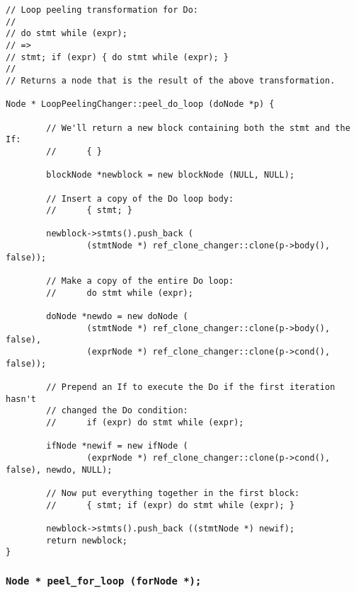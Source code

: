 \documentclass[10pt]{article}
\begin{document}
\begin{small}
\begin{verbatim}
// Loop peeling transformation for Do:
//
// do stmt while (expr);
// =>
// stmt; if (expr) { do stmt while (expr); }
//
// Returns a node that is the result of the above transformation.

Node * LoopPeelingChanger::peel_do_loop (doNode *p) {

        // We'll return a new block containing both the stmt and the If:
        //      { }

        blockNode *newblock = new blockNode (NULL, NULL);

        // Insert a copy of the Do loop body:
        //      { stmt; }

        newblock->stmts().push_back (
                (stmtNode *) ref_clone_changer::clone(p->body(), false));

        // Make a copy of the entire Do loop:
        //      do stmt while (expr);

        doNode *newdo = new doNode (
                (stmtNode *) ref_clone_changer::clone(p->body(), false),
                (exprNode *) ref_clone_changer::clone(p->cond(), false));

        // Prepend an If to execute the Do if the first iteration hasn't 
        // changed the Do condition:
        //      if (expr) do stmt while (expr);

        ifNode *newif = new ifNode (
                (exprNode *) ref_clone_changer::clone(p->cond(), false), newdo, NULL);

        // Now put everything together in the first block:
        //      { stmt; if (expr) do stmt while (expr); }

        newblock->stmts().push_back ((stmtNode *) newif);
        return newblock;
}
\end{verbatim}
\end{small}

\subsubsection{{\tt Node * peel\_for\_loop (forNode *);}}
\end{document}
